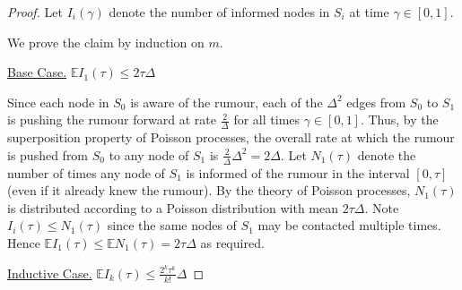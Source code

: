 \begin{proof}
	Let $I_i(\gamma)$ denote the number of informed nodes in $S_i$ at time $\gamma \in [0,1]$. 

	We prove the claim by induction on $m$. %

	\underline{Base Case.} $\mathbb{E}I_1(\tau) \leq 2 \tau \Delta$

	Since each node in $S_0$ is aware of the rumour, each of the $\Delta^2$ edges from $S_0$ to $S_1$ is pushing the rumour forward at rate $\frac{2}{\Delta}$ for all times $\gamma \in [0,1]$. Thus, by the superposition property of Poisson processes, the overall rate at which the rumour is pushed from $S_0$ to any node of $S_1$ is $\frac{2}{\Delta}\Delta^2 = 2\Delta$. Let $N_1(\tau)$ denote the number of times any node of $S_1$ is informed of the rumour in the interval $[0,\tau]$ (even if it already knew the rumour). By the theory of Poisson processes, $N_1(\tau)$ is distributed according to a Poisson distribution with mean $2\tau\Delta$. Note $I_i(\tau) \leq N_1(\tau)$ since the same nodes of $S_1$ may be contacted multiple times. Hence $\mathbb{E}I_1(\tau) \leq \mathbb{E}N_1(\tau) = 2\tau\Delta$ as required.
	
	\underline{Inductive Case.} $\mathbb{E}I_k(\tau) \leq \frac{2^k \tau^k}{k!}\Delta$


\end{proof}
